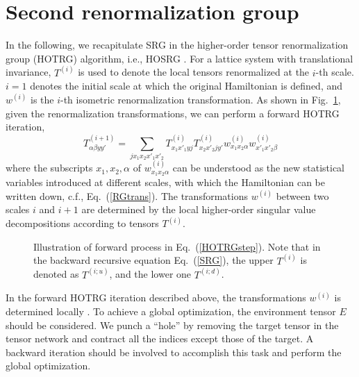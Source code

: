 \documentclass[aps,prx,twocolumn,showpacs,psfig,superscriptaddress,longbibliography]{revtex4-1}
\def\beq{\begin{equation}}
\def\eeq{\end{equation}}
\begin{document}
\section{Second renormalization group}
\label{App:SRG}
In the following, we recapitulate SRG in the higher-order tensor renormalization group (HOTRG) algorithm, i.e., HOSRG \cite{Xie2012,HOSRG-PRB2016}. For a lattice system with translational invariance, $T^{(i)}$ is used to denote the local tensors renormalized at the $i$-th scale. $i=1$ denotes the initial scale at which the original Hamiltonian is defined, and $w^{(i)}$ is the $i$-th isometric renormalization transformation. 
As shown in Fig.~\ref{Fig:HOTRG}, given the renormalization transformations, we can perform a forward HOTRG iteration, 
\beq
T^{(i+1)}_{\alpha\beta yy'} = \sum_{jx_1x_2x'_1x'_2} T^{(i)}_{x_1x'_1yj}T^{(i)}_{x_2x'_2jy'} w^{(i)}_{x_1x_2\alpha} w^{(i)}_{x'_1x'_2\beta} \label{HOTRGstep}
\eeq
where the subscripts ${x_1, x_2, \alpha}$ of $w_{x_1x_2\alpha}^{(i)}$ can be understood as the new statistical variables introduced at different scales, with which the Hamiltonian can be written down, c.f., Eq.~(\ref{RGtrans}).
The transformations $w^{(i)}$ between  two scales $i$ and $i+1$ are determined by the local higher-order singular value decompositions according to tensors $T^{(i)}$. 

\begin{figure}
\centering
{}
\caption{Illustration of forward process in Eq.~(\ref{HOTRGstep}). Note that in the backward recursive equation Eq.~(\ref{SRG}), the upper $T^{(i)}$ is denoted as $T^{(i;u)}$, and the lower one $T^{(i;d)}$. }
\label{Fig:HOTRG}
\end{figure}
In the forward HOTRG iteration described above, the transformations $w^{(i)}$ is determined locally \cite{Xie2012}. To achieve a global optimization, the environment tensor $E$ should be considered. We punch a ``hole'' by removing the target tensor in the tensor network and contract all the indices except those of the target. A backward iteration should be involved to accomplish this task and perform the global optimization. 
\end{document}
